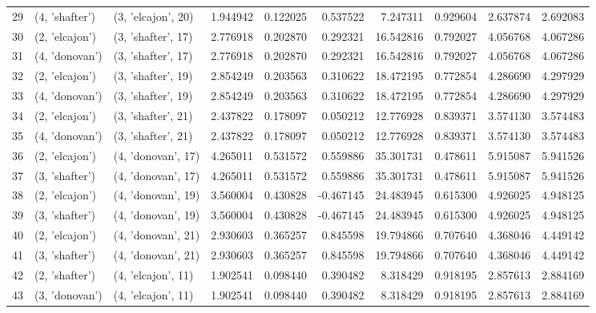 \begin{tabular}{lllrrrrrrr}
29 &   (4, 'shafter') &  (3, 'elcajon', 20) &  1.944942 &   0.122025 &  0.537522 &   7.247311 &  0.929604 &   2.637874 &  2.692083 \\
30 &   (2, 'elcajon') &  (3, 'shafter', 17) &  2.776918 &   0.202870 &  0.292321 &  16.542816 &  0.792027 &   4.056768 &  4.067286 \\
31 &   (4, 'donovan') &  (3, 'shafter', 17) &  2.776918 &   0.202870 &  0.292321 &  16.542816 &  0.792027 &   4.056768 &  4.067286 \\
32 &   (2, 'elcajon') &  (3, 'shafter', 19) &  2.854249 &   0.203563 &  0.310622 &  18.472195 &  0.772854 &   4.286690 &  4.297929 \\
33 &   (4, 'donovan') &  (3, 'shafter', 19) &  2.854249 &   0.203563 &  0.310622 &  18.472195 &  0.772854 &   4.286690 &  4.297929 \\
34 &   (2, 'elcajon') &  (3, 'shafter', 21) &  2.437822 &   0.178097 &  0.050212 &  12.776928 &  0.839371 &   3.574130 &  3.574483 \\
35 &   (4, 'donovan') &  (3, 'shafter', 21) &  2.437822 &   0.178097 &  0.050212 &  12.776928 &  0.839371 &   3.574130 &  3.574483 \\
36 &   (2, 'elcajon') &  (4, 'donovan', 17) &  4.265011 &   0.531572 &  0.559886 &  35.301731 &  0.478611 &   5.915087 &  5.941526 \\
37 &   (3, 'shafter') &  (4, 'donovan', 17) &  4.265011 &   0.531572 &  0.559886 &  35.301731 &  0.478611 &   5.915087 &  5.941526 \\
38 &   (2, 'elcajon') &  (4, 'donovan', 19) &  3.560004 &   0.430828 & -0.467145 &  24.483945 &  0.615300 &   4.926025 &  4.948125 \\
39 &   (3, 'shafter') &  (4, 'donovan', 19) &  3.560004 &   0.430828 & -0.467145 &  24.483945 &  0.615300 &   4.926025 &  4.948125 \\
40 &   (2, 'elcajon') &  (4, 'donovan', 21) &  2.930603 &   0.365257 &  0.845598 &  19.794866 &  0.707640 &   4.368046 &  4.449142 \\
41 &   (3, 'shafter') &  (4, 'donovan', 21) &  2.930603 &   0.365257 &  0.845598 &  19.794866 &  0.707640 &   4.368046 &  4.449142 \\
42 &   (2, 'shafter') &  (4, 'elcajon', 11) &  1.902541 &   0.098440 &  0.390482 &   8.318429 &  0.918195 &   2.857613 &  2.884169 \\
43 &   (3, 'donovan') &  (4, 'elcajon', 11) &  1.902541 &   0.098440 &  0.390482 &   8.318429 &  0.918195 &   2.857613 &  2.884169 \\

\end{tabular}
